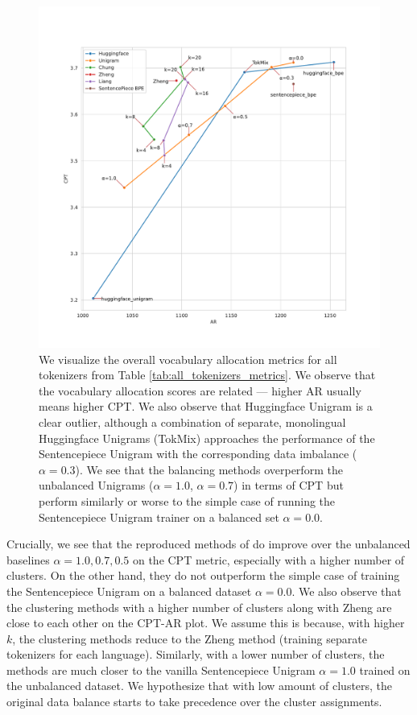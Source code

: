 \begin{figure}[H]
    \centering
    \includegraphics[width=\textwidth]{figures/all_tokenizers_AR_vs_CPT.pdf}
    \caption{We visualize the overall vocabulary allocation metrics for all tokenizers from Table \ref{tab:all_tokenizers_metrics}. We observe that the vocabulary allocation scores are related --- higher AR usually means higher CPT.  We also observe that Huggingface Unigram is a clear outlier, although a combination of separate, monolingual Huggingface Unigrams (TokMix) approaches the performance of the Sentencepiece Unigram with the corresponding data imbalance ($\alpha=0.3$). We see that the balancing methods overperform the unbalanced Unigrams ($\alpha=1.0$, $\alpha=0.7$) in terms of CPT but perform similarly or worse to the simple case of running the Sentencepiece Unigram trainer on a balanced set $\alpha=0.0$.}
    \label{fig:all_tokenizers_AR_vs_CPT}
\end{figure}

Crucially, we see that the reproduced methods of \citet{chung_improving_2020,zheng_allocating_2021,liang_xlm-v_2023} do improve over the unbalanced baselines $\alpha=1.0, 0.7, 0.5$ on the CPT metric, especially with a higher number of clusters. On the other hand, they do not outperform the simple case of training the Sentencepiece Unigram on a balanced dataset $\alpha=0.0$. We also observe that the clustering methods with a higher number of clusters along with Zheng are close to each other on the CPT-AR plot. We assume this is because, with higher $k$, the clustering methods reduce to the Zheng method (training separate tokenizers for each language). Similarly, with a lower number of clusters, the methods are much closer to the vanilla Sentencepiece Unigram $\alpha=1.0$ trained on the unbalanced dataset. We hypothesize that with low amount of clusters, the original data balance starts to take precedence over the cluster assignments.

